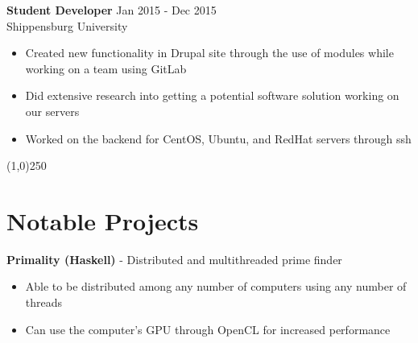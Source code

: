 \documentclass[margin,line, 11pt]{resume}
\begin{document}
\begin{resume}
    \textbf{Student Developer} 	\hfill Jan 2015 - Dec 2015 \vspace{1.5mm}\\
    Shippensburg University 
    \begin{itemize}

	\item Created new functionality in Drupal site through the use of modules while working on a team using GitLab

	\item Did extensive research into getting a potential software solution working on our servers
	\item Worked on the backend for CentOS, Ubuntu, and RedHat servers through ssh

    \end{itemize}
    
    \vspace{-5mm}
    \line(1,0){250}
    \vspace{-4mm}
    
    

    
    \section{\mysidestyle \textbf {Notable Projects}}
    
    \vspace{0mm}

     \textbf{Primality (Haskell)} - Distributed and multithreaded prime finder
     \begin{itemize}
      \item Able to be distributed among any number of computers using any number of threads
      \item Can use the computer's GPU through OpenCL for increased performance
     \end{itemize}


\end{resume}
\end{document}
